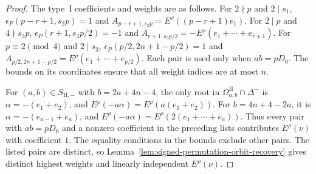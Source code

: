 \documentclass[11pt,a4paper]{amsart}
\theoremstyle{plain}
\numberwithin{equation}{section}
\newenvironment{pf}{\begin{proof}}{\end{proof}}
\begin{document}
\begin{pf}
	The type~\(\mathrm I\) coefficients and weights are as follows.
	For \(2\nmid p\) and \(2\mid s_1\),
	\(\epsilon_P(p-r+1,s_2p)=1\) and
	\(A_{p-r+1,s_2p}=E^\rho((p-r+1)e_1)\).
	For \(2\mid p\) and \(4\nmid s_3p\),
	\(\epsilon_P(r+1,s_3p/2)=-1\) and
	\(A_{r+1,s_3p/2}=-E^\rho(e_1+\cdots+e_{r+1})\).
	For \(p\equiv2\pmod4\) and \(2\mid s_3\),
	\(\epsilon_P(p/2,2n+1-p/2)=1\) and
	\(A_{p/2,2n+1-p/2}=E^\rho(e_1+\cdots+e_{p/2})\).
	Each pair is used only when \(ab=pD_0\).
	The bounds on its coordinates ensure that all weight indices are
	at most \(n\).
	
	For \((a,b)\in S_{\mathrm{II},-}\) with \(b=2a+4n-4\),
	the only root in \(\Omega_{a,b}^{\mathrm{II}}\cap\Delta^-\) is
	\(\alpha=-(e_1+e_2)\), and
	\(E^\rho(-a\alpha)=E^\rho(a(e_1+e_2))\).
	For \(b=4n+4-2a\), it is \(\alpha=-(e_{a-1}+e_a)\), and
	\(E^\rho(-a\alpha)=E^\rho(2(e_1+\cdots+e_a))\).
	Thus every pair with \(ab=pD_0\) and a nonzero coefficient in
	the preceding lists contributes \(E^\rho(\nu)\) with coefficient \(1\).
	The equality conditions in the bounds exclude other pairs.
	The listed pairs are distinct, so
	Lemma~\ref{lem:signed-permutation-orbit-recovery} gives distinct
	highest weights and linearly independent \(E^\rho(\nu)\).
	
	\smallskip
	

\end{pf}
\end{document}
